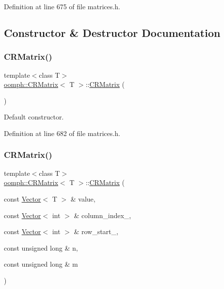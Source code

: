 Definition at line 675 of file matrices.\+h.



\subsection{Constructor \& Destructor Documentation}
\mbox{\label{classoomph_1_1CRMatrix_a0b362175c2474a0531ed7b196681209b}} 
\subsubsection{\texorpdfstring{C\+R\+Matrix()}{CRMatrix()}\hspace{0.1cm}{\footnotesize\ttfamily [1/3]}}
{\footnotesize\ttfamily template$<$class T$>$ \\
\hyperlink{classoomph_1_1CRMatrix}{oomph\+::\+C\+R\+Matrix}$<$ T $>$\+::\hyperlink{classoomph_1_1CRMatrix}{C\+R\+Matrix} (\begin{DoxyParamCaption}{ }\end{DoxyParamCaption})\hspace{0.3cm}{\ttfamily [inline]}}



Default constructor. 



Definition at line 682 of file matrices.\+h.

\mbox{\label{classoomph_1_1CRMatrix_afefb2869fd01835cd23a8db25b90148f}} 
\subsubsection{\texorpdfstring{C\+R\+Matrix()}{CRMatrix()}\hspace{0.1cm}{\footnotesize\ttfamily [2/3]}}
{\footnotesize\ttfamily template$<$class T$>$ \\
\hyperlink{classoomph_1_1CRMatrix}{oomph\+::\+C\+R\+Matrix}$<$ T $>$\+::\hyperlink{classoomph_1_1CRMatrix}{C\+R\+Matrix} (\begin{DoxyParamCaption}\item[{const \hyperlink{classoomph_1_1Vector}{Vector}$<$ T $>$ \&}]{value,  }\item[{const \hyperlink{classoomph_1_1Vector}{Vector}$<$ int $>$ \&}]{column\+\_\+index\+\_\+,  }\item[{const \hyperlink{classoomph_1_1Vector}{Vector}$<$ int $>$ \&}]{row\+\_\+start\+\_\+,  }\item[{const unsigned long \&}]{n,  }\item[{const unsigned long \&}]{m }\end{DoxyParamCaption})\hspace{0.3cm}{\ttfamily [inline]}}



